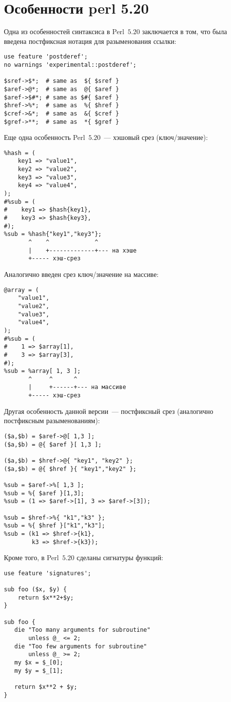 \section{Особенности perl 5.20}
Одна из особенностей синтаксиса в Perl~$5.20$ заключается в том, что была введена {постфиксная нотация для разыменования ссылки}:
\begin{verbatim}
use feature 'postderef';
no warnings 'experimental::postderef';

$sref->$*;  # same as  ${ $sref }
$aref->@*;  # same as  @{ $aref }
$aref->$#*; # same as $#{ $aref }
$href->%*;  # same as  %{ $href }
$cref->&*;  # same as  &{ $cref }
$gref->**;  # same as  *{ $gref }
\end{verbatim}
Еще одна особенность Perl~$5.20$~--- {хэшовый срез} (ключ/значение):
\begin{verbatim}
%hash = (
	key1 => "value1",
	key2 => "value2",
	key3 => "value3",
	key4 => "value4",
);
#%sub = (
#    key1 => $hash{key1},
#    key3 => $hash{key3},
#);
%sub = %hash{"key1","key3"};
       ^    ^             ^
       |    +-------------+--- на хэше
       +----- хэш-срез
\end{verbatim}
Аналогично введен {срез ключ/значение на массиве}:
\begin{verbatim}
@array = (
    "value1",
    "value2",
    "value3",
    "value4",
);
#%sub = (
#    1 => $array[1],
#    3 => $array[3],
#);
%sub = %array[ 1, 3 ];
       ^     ^      ^
       |     +------+--- на массиве
       +----- хэш-срез
\end{verbatim}
Другая особенность данной версии~--- {постфиксный срез} (аналогично постфиксным разыменованиям):
\begin{verbatim}
($a,$b) = $aref->@[ 1,3 ];
($a,$b) = @{ $aref }[ 1,3 ];

($a,$b) = $href->@{ "key1", "key2" };
($a,$b) = @{ $href }{ "key1","key2" };

%sub = $aref->%[ 1,3 ];
%sub = %{ $aref }[1,3];
%sub = (1 => $aref->[1], 3 => $aref->[3]);

%sub = $href->%{ "k1","k3" };
%sub = %{ $href }["k1","k3"];
%sub = (k1 => $href->{k1},
        k3 => $href->{k3});
\end{verbatim}
Кроме того, в Perl~$5.20$ сделаны {сигнатуры функций}:
\begin{verbatim}
use feature 'signatures';

sub foo ($x, $y) {
    return $x**2+$y;
}

sub foo {
   die "Too many arguments for subroutine"
       unless @_ <= 2;
   die "Too few arguments for subroutine"
       unless @_ >= 2;
   my $x = $_[0];
   my $y = $_[1];

   return $x**2 + $y;
}
\end{verbatim}

